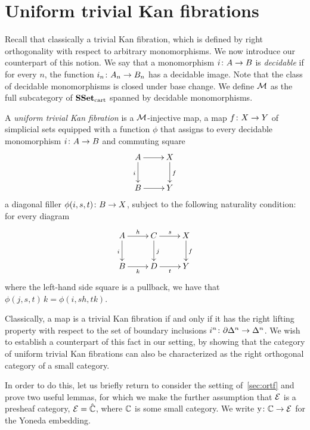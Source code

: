 \documentclass[reqno,10pt,a4paper,oneside]{amsart}
\begin{document}
\section{Uniform trivial Kan fibrations}

Recall that classically a trivial Kan fibration, which is defined by right orthogonality with respect to arbitrary monomorphisms. We now introduce our counterpart of this notion. We say that a monomorphism 
$i \co A \to B$ is  \emph{decidable} if for every $n$, the function $i_n \co A_n \to B_n$ has a decidable image. 
Note that the class of decidable monomorphisms is closed under base change. We define $\cal{M}$ as the full subcategory of $\SSet_\cart$ spanned by decidable monomorphisms. 

\begin{definition} A \emph{uniform trivial Kan fibration}  is a $\cal{M}$-injective map,
\ie a map $f \co X \to Y$ of simplicial sets equipped with a function $\phi$
that assigns to every decidable monomorphism $i \co A \to B$ and commuting square 
 \[
 \xymatrix{
 A \ar[r] \ar[d]_i & X \ar[d]^f \\
 B \ar[r] & Y}
 \]
a diagonal filler $\phi(i, s, t) \co B \to X$, subject to the following naturality condition: for every 
diagram 
\[
\xymatrix{
A \ar[r]^{h} \ar[d]_{i} & C \ar[d]^{j}  \ar[r]^s & X \ar[d]^f \\
B \ar[r]_{k} & D \ar[r]_t & Y }
\]
where the left-hand side square is a pullback, we have that $\phi(j, s, t) \, k = \phi(i, s  h, t  k)$.
 \end{definition} 
 
 
 
 
 
 
Classically, a map is a  trivial Kan fibration if and only if it has the right lifting property with respect to the
set of boundary inclusions $i^n \co \partial \Delta^n \to \Delta^n$. We wish to establish a counterpart of 
this fact in our setting, by showing that the category of uniform trivial Kan fibrations can also be 
characterized as the right orthogonal category of  a small category.






\medskip

\newcommand{\yon}{\mathrm{y}} 

In order to do this, let us briefly return to consider the setting of~\cref{sec:ortf} and prove two useful lemmas,
for which we make the further assumption that $\catE$ is a presheaf category, \ie $\catE = \hat{\cat{C}}$, where $\catC$ is some small category. We write $\yon \co \cat{C} \to \catE$ for the Yoneda embedding.
\end{document}

